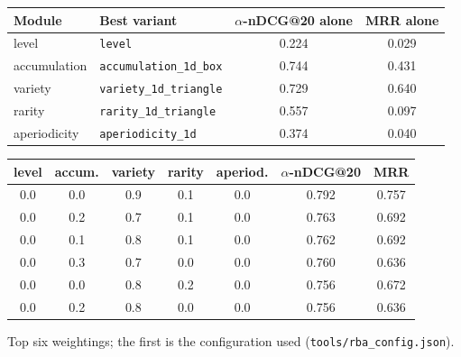 \documentclass[10.5pt,a4paper]{article}
\begin{document}
\begin{center}\small
\begin{tabular}{@{}l l c c@{}}
\toprule
Module & Best variant & $\alpha$-nDCG@20 alone & MRR alone \\
\midrule
level & \texttt{level} & 0.224 & 0.029 \\
accumulation & \texttt{accumulation\_1d\_box} & 0.744 & 0.431 \\
variety & \texttt{variety\_1d\_triangle} & 0.729 & 0.640 \\
rarity & \texttt{rarity\_1d\_triangle} & 0.557 & 0.097 \\
aperiodicity & \texttt{aperiodicity\_1d} & 0.374 & 0.040 \\
\bottomrule
\end{tabular}
\end{center}

\begin{center}\small
\begin{tabular}{@{}ccccc cc@{}}
\toprule
level & accum. & variety & rarity & aperiod. & $\alpha$-nDCG@20 & MRR \\
\midrule
0.0 & 0.0 & 0.9 & 0.1 & 0.0 & 0.792 & 0.757 \\
0.0 & 0.2 & 0.7 & 0.1 & 0.0 & 0.763 & 0.692 \\
0.0 & 0.1 & 0.8 & 0.1 & 0.0 & 0.762 & 0.692 \\
0.0 & 0.3 & 0.7 & 0.0 & 0.0 & 0.760 & 0.636 \\
0.0 & 0.0 & 0.8 & 0.2 & 0.0 & 0.756 & 0.672 \\
0.0 & 0.2 & 0.8 & 0.0 & 0.0 & 0.756 & 0.636 \\
\bottomrule
\end{tabular}
\par\smallskip\footnotesize Top six weightings; the first is the configuration used (\texttt{tools/rba\_config.json}).
\end{center}
\end{document}
